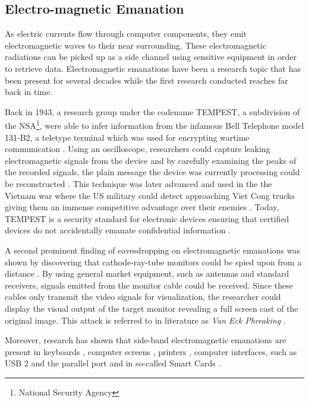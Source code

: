 \subsection{Electro-magnetic Emanation}
As electric currents flow through computer components, they emit electromagnetic waves to their near surrounding. These electromagnetic radiations can be picked up as a side channel using sensitive equipment in order to retrieve data. Electromagnetic emanations have been a research topic that has been present for several decades while the first research conducted reaches far back in time.

Back in 1943, a research group under the codename TEMPEST, a subdivision of the NSA\footnote{National Security Agency}, were able to infer information from the infamous Bell Telephone model 131-B2, a teletype terminal which was used for encrypting wartime communication \cite{tempest}. Using an oscilloscope, researchers could capture leaking electromagnetic signals from the device and by carefully examining the peaks of the recorded signals, the plain message the device was currently processing could be reconstructed \cite{tempest}. This technique was later advanced and used in the the Vietnam war where the US military could detect approaching Viet Cong trucks giving them an immense competitive advantage over their enemies \cite{nalty2005war}. Today, TEMPEST is a security standard for electronic devices ensuring that certified devices do not accidentally emanate confidential information \cite{niaTempest}.

A second prominent finding of eavesdropping on electromagnetic emanations was shown by \citeauthor{vanEck:1985:ERV:7307.7308} discovering that cathode-ray-tube monitors could be spied upon from a distance \cite{vanEck:1985:ERV:7307.7308}. By using general market equipment, such as antennas \citeauthor{vanEck:1985:ERV:7307.7308} and standard receivers, signals emitted from the monitor cable could be received. Since these cables only transmit the video signals for visualization, the researcher could display the visual output of the target monitor revealing a full screen cast of the original image. This attack is referred to in literature as \textit{Van Eck Phreaking} \cite{S&S,koch2012role}.

Moreover, research has shown that side-band electromagnetic emanations are present in keyboards \cite{Vuagnoux:2009:CEE:1855768.1855769}, computer screens \cite{vanEck:1985:ERV:7307.7308,kuhn2004electromagnetic}, printers \cite{przesmycki2014measurement}, computer interfaces, such as USB 2 \cite{nowosielski2014compromising} and the parallel port \cite{serialcablearticle} and in so-called Smart Cards \cite{Quisquater:2001:EAM:646803.705980}.

